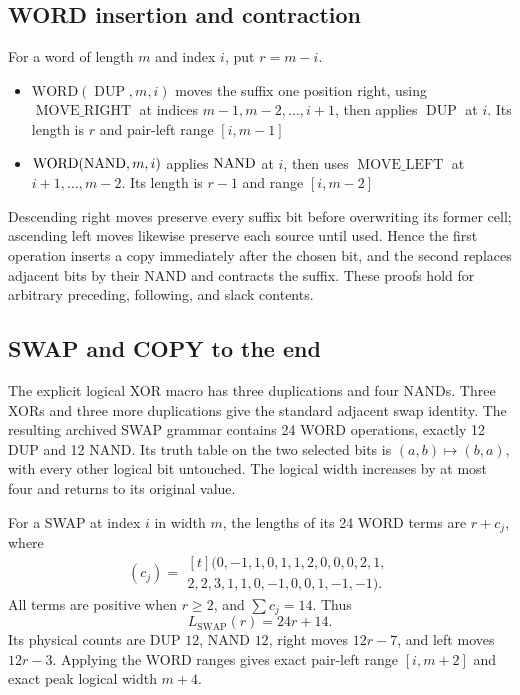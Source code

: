 \documentclass[11pt,letterpaper]{article}
\theoremstyle{definition}\newtheorem{definition}[theorem]{Definition}
\theoremstyle{remark}\newtheorem{remark}[theorem]{Remark}
\newcommand{\DUP}{\operatorname{DUP}}\newcommand{\ML}{\operatorname{MOVE\_LEFT}}
\newcommand{\MR}{\operatorname{MOVE\_RIGHT}}\newcommand{\COPY}{\operatorname{COPY}}
\newcommand{\SWAP}{\operatorname{SWAP}}
\begin{document}
\subsection{WORD insertion and contraction}
For a word of length $m$ and index $i$, put $r=m-i$.
\begin{itemize}
\item $\mathrm{WORD}(\DUP,m,i)$ moves the suffix one position right, using $\MR$ at indices $m-1,m-2,\ldots,i+1$, then applies $\DUP$ at $i$. Its length is $r$ and pair-left range $[i,m-1]$
\item $\mathrm{WORD}(\operatorname{NAND},m,i)$ applies $\operatorname{NAND}$ at $i$, then uses $\ML$ at $i+1,\ldots,m-2$. Its length is $r-1$ and range $[i,m-2]$
\end{itemize}
Descending right moves preserve every suffix bit before overwriting its former cell; ascending left moves likewise preserve each source until used. Hence the first operation inserts a copy immediately after the chosen bit, and the second replaces adjacent bits by their NAND and contracts the suffix. These proofs hold for arbitrary preceding, following, and slack contents.

\subsection{SWAP and COPY to the end}
The explicit logical XOR macro has three duplications and four NANDs. Three XORs and three more duplications give the standard adjacent swap identity. The resulting archived SWAP grammar contains 24 WORD operations, exactly 12 DUP and 12 NAND. Its truth table on the two selected bits is $(a,b)\mapsto(b,a)$, with every other logical bit untouched. The logical width increases by at most four and returns to its original value.

For a SWAP at index $i$ in width $m$, the lengths of its 24 WORD terms are $r+c_j$, where
\[
(c_j)=\begin{gathered}[t]
(0,-1,1,0,1,1,2,0,0,0,2,1,\\
 2,2,3,1,1,0,-1,0,0,1,-1,-1).
\end{gathered}
\]
All terms are positive when $r\ge2$, and $\sum c_j=14$. Thus
\[
 L_{\SWAP}(r)=24r+14.
\]
Its physical counts are DUP $12$, NAND $12$, right moves $12r-7$, and left moves $12r-3$. Applying the WORD ranges gives exact pair-left range $[i,m+2]$ and exact peak logical width $m+4$.
\end{document}
